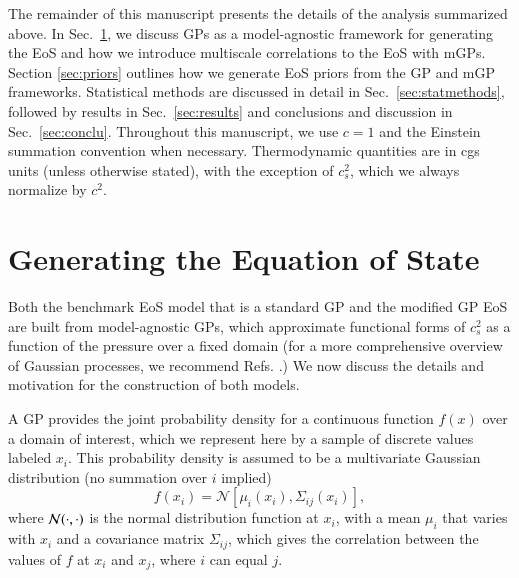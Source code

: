 \documentclass[aps,prd,nofootinbib,tightenlines,notitlepage,floatfix,superscriptaddress,showkeys,twocolumn]{revtex4-1}
\begin{document}
The remainder of this manuscript presents the details of the analysis summarized above. In Sec.~\ref{sec:EOSgen}, we discuss GPs as a model-agnostic framework for generating the EoS and how we introduce multiscale correlations to the EoS with mGPs. Section \ref{sec:priors} outlines how we generate EoS priors from the GP and mGP frameworks. Statistical methods are discussed in detail in Sec.~\ref{sec:statmethods}, followed by results in Sec.\ \ref{sec:results} and conclusions and discussion in Sec.\ \ref{sec:conclu}. Throughout this manuscript, we use $c = 1$ and the Einstein summation convention when necessary. Thermodynamic quantities are in cgs units (unless otherwise stated), with the exception of $c_s^2$, which we always normalize by $c^2$.

\section{Generating the Equation of State}\label{sec:EOSgen}

Both the benchmark EoS model that is a standard GP and the modified GP EoS are built from model-agnostic GPs, which approximate functional forms of $c_s^2$ as a function of the pressure over a fixed domain (for a more comprehensive overview of Gaussian processes, we recommend Refs. \cite{Landry:2018prl,williams2006gaussian}.) We now discuss the details and motivation for the construction of both models. 

A GP provides the joint probability density for a continuous function $f(x)$ over a domain of interest, which we represent here by a sample of discrete values labeled $x_i$. This probability density is assumed to be a multivariate Gaussian distribution (no summation over $i$ implied)
\begin{equation}\label{eq:phidist}
    f(x_i) = \mathcal{N}\left[\mu_i(x_i),\Sigma_{ij}(x_i)\right],
\end{equation}
where ${\cal{N}}(\cdot,\cdot)$ is the normal distribution function at $x_i$, with a mean $\mu_i$ that varies with $x_i$ and a covariance matrix $\Sigma_{ij}$, which gives the correlation between the values of $f$ at $x_i$ and $x_j$, where $i$ can equal $j$.
\end{document}
